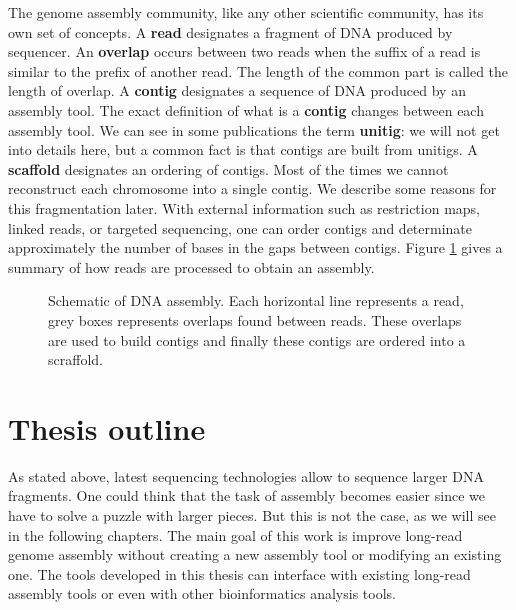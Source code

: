 \documentclass[./main.tex]{subfiles}
\begin{document}
\bigskip

The genome assembly community, like any other scientific community, has its own set of concepts. 
%
A \textbf{read} designates a fragment of DNA produced by sequencer.
%
An \textbf{overlap} occurs between two reads when the suffix of a read is similar to the prefix of another read. The length of the common part is called the length of overlap.
%
A \textbf{contig} designates a sequence of DNA produced by an assembly tool. The exact definition of what is a \textbf{contig} changes between each assembly tool. We can see in some publications the term \textbf{unitig}: we will not get into details here, but a common fact is that contigs are built from unitigs.
%
A \textbf{scaffold} designates an ordering of contigs. Most of the times we cannot reconstruct each chromosome into a single contig. We describe some reasons for this fragmentation later. With external information such as restriction maps, linked reads, or targeted sequencing, one can order contigs and determinate approximately the number of bases in the gaps between contigs. %
%
Figure \ref{intro:fig:assembly} gives a summary of how reads are processed to obtain an assembly.
\begin{figure}[ht]
	\centering
	
	\caption{Schematic of DNA assembly. Each horizontal line represents a read, grey boxes represents overlaps found between reads. These overlaps are used to build contigs and finally these contigs are ordered into a scraffold.}
    \label{intro:fig:assembly}
\end{figure}

\section{Thesis outline}


As stated above, latest sequencing technologies allow to sequence larger DNA fragments. One could think that the task of assembly becomes easier since we have to solve a puzzle with larger pieces. But this is not the case, as we will see in the following chapters. The main goal of this work is improve long-read genome assembly without creating a new assembly tool or modifying an existing one. The tools developed in this thesis can interface with existing long-read assembly tools or even with other bioinformatics analysis tools.
\end{document}
